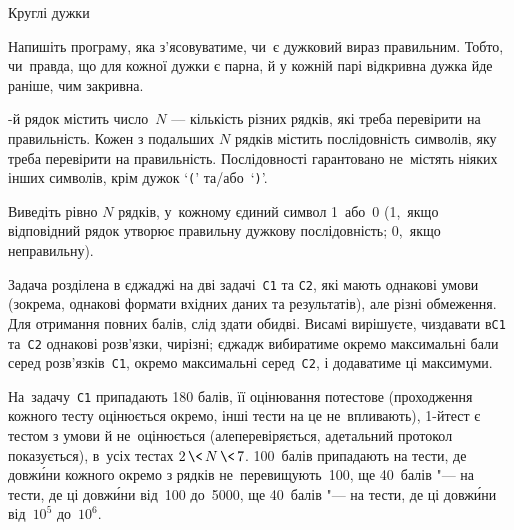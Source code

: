 \begin{problemAllDefault}{Круглі дужки}

Напишіть програму, яка з'ясовуватиме, чи~є дужковий вираз правильним. Тобто, чи~правда, що для кожної дужки є парна, й у кожній парі відкривна дужка йде раніше, чим закривна.

-й рядок містить число~$N$ --- кількість різних рядків, які треба перевірити на правильність. 
Кожен з подальших $N$ рядків містить послідовність символів,
яку треба перевірити на правильність. 
Послідовності гарантовано не~містять ніяких інших символів, крім дужок `\texttt{(}' та/або~`\texttt{)}'. 



\OutputFile
Виведіть рівно $N$ рядків, у~кожному єдиний символ 1~або~0 (1,~якщо відповідний рядок утворює правильну дужкову послідовність; 0,~якщо неправильну).

\Notes
Задача розділена в єджа\-джі на дві задачі~\texttt{C1} та \texttt{C2}, які мають однакові умови 
(зокрема, однакові формати вхідних даних та результатів),
але різні обмеження. 
Для отримання повних балів, слід здати обидві. %
Ви\nolinebreak[3] самі вирішуєте, чи\nolinebreak[3] здавати в\nolinebreak[3] \texttt{C1} та~\texttt{C2} однакові розв'язки, чи\nolinebreak[3] різні; 
єджадж вибиратиме окремо максимальні бали серед %
розв'язків~\texttt{C1}, окремо максимальні 
серед~\texttt{C2}, 
і додаватиме ці максимуми. 

На~задачу~\texttt{C1} припадають 180 балів, її оцінювання потестове (проходження кожного тесту оцінюється окремо, інші тести на це не~впливають),
\mbox{1-й}\nolinebreak[3] тест є тестом з умови й не~оцінюється (але\nolinebreak[3] перевіряється, а\nolinebreak[3] детальний протокол показується),
в~усіх тестах ${2\,{\<}\,N\,{\<}\,7}$.
100~балів припадають на тести, де довж\'{и}ни кожного окремо з рядків не~перевищують~100, 
ще 40~балів "--- на тести, де ці довж\'{и}ни від~100 до~5000,
ще 40~балів "--- на тести, де ці довж\'{и}ни від~$10^5$ до~$10^6$.


\end{problemAllDefault}
